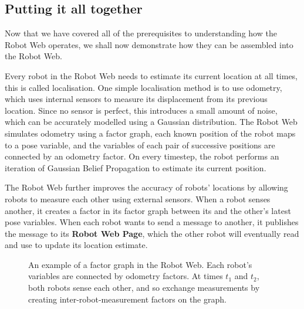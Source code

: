 

\subsection{Putting it all together}
Now that we have covered all of the prerequisites to understanding how the Robot Web operates, we shall now demonstrate how they can be assembled into the Robot Web.

Every robot in the Robot Web needs to estimate its current location at all times, this is called localisation. One simple localisation method is to use odometry, which uses internal sensors to measure its displacement from its previous location. Since no sensor is perfect, this introduces a small amount of noise, which can be accurately modelled using a Gaussian distribution. The Robot Web simulates odometry using a factor graph, each known position of the robot maps to a pose variable, and the variables of each pair of successive positions are connected by an odometry factor. On every timestep, the robot performs an iteration of Gaussian Belief Propagation to estimate its current position.

The Robot Web further improves the accuracy of robots' locations by allowing robots to measure each other using external sensors. When a robot senses another, it creates a factor in its factor graph between its and the other's latest pose variables. When each robot wants to send a message to another, it publishes the message to its \textbf{Robot Web Page}, which the other robot will eventually read and use to update its location estimate.

\begin{figure}[!h]
    \centering
    

    \caption[Robot Web factor graph]{An example of a factor graph in the Robot Web. Each robot's variables are connected by odometry factors. At times $t_1$ and $t_2$, both robots sense each other, and so exchange measurements by creating inter-robot-measurement factors on the graph.}
\end{figure}

